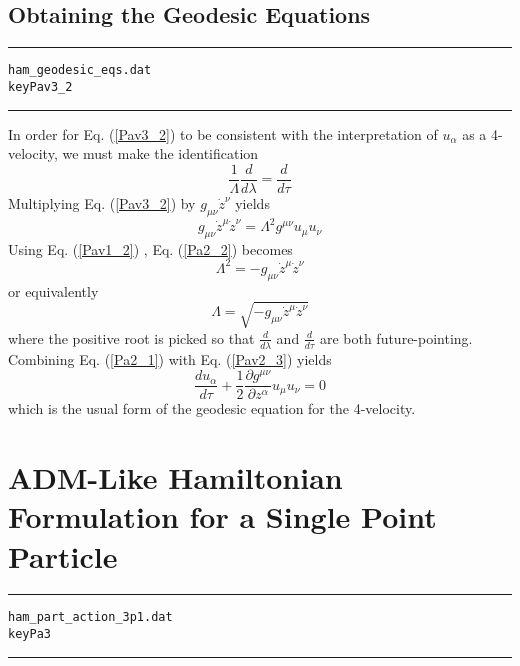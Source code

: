 \documentclass[12pt]{article}
\begin{document}
\subsection{Obtaining the Geodesic Equations}

\clearpage
\vspace{5mm}
\hrule
\begin{alltt}
  ham_geodesic_eqs.dat
  key Pav3_2
\end{alltt}
\hrule
\vspace{5mm}

In order for Eq. (\ref{Pav3_2}) to be consistent with the
interpretation of $ {u}_{\alpha} $ as a 4-velocity, we must
make the identification
\begin{equation}\label{Pa2_1}
\frac{1}{ \Lambda } \frac{ d }{d \lambda} = \frac{ d }{d \tau}
\end{equation}
Multiplying Eq. (\ref{Pav3_2}) by $ {g}_{\mu \nu} {\dot z}^{\nu} $ yields
\begin{equation}\label{Pa2_2}
{g}_{\mu \nu} {\dot z}^{\mu} {\dot z}^{\nu} = \Lambda ^2 {g}^{\mu \nu} {u}_{\mu} {u}_{\nu}
\end{equation}
Using Eq. (\ref{Pav1_2}) , Eq. (\ref{Pa2_2}) becomes
\begin{equation}\label{Pa2_3}
\Lambda ^2 = - {g}_{\mu \nu} {\dot z}^{\mu} {\dot z}^{\nu}
\end{equation}
or equivalently
\begin{equation}\label{Pa2_4}
\Lambda = \sqrt{ - {g}_{\mu \nu} {\dot z}^{\mu} {\dot z}^{\nu} }
\end{equation}
where the positive root is picked so that $ \frac{ d }{d \lambda} $ and
$ \frac{ d }{d \tau} $ are both future-pointing.
Combining Eq. (\ref{Pa2_1}) with Eq. (\ref{Pav2_3}) yields
\begin{equation}\label{Pa2_5}
\frac{ d {u}_{\alpha}}{d \tau} + \frac{1}{2} \frac{\partial {g}^{\mu \nu}}{\partial {z ^ \alpha}} {u}_{\mu} {u}_{\nu} = 0
\end{equation}
which is the usual form of the geodesic equation for the
4-velocity.
\section{ADM-Like Hamiltonian Formulation for a Single Point Particle}

\clearpage
\vspace{5mm}
\hrule
\begin{alltt}
  ham_part_action_3p1.dat
  key Pa3
\end{alltt}
\hrule
\vspace{5mm}
\end{document}
